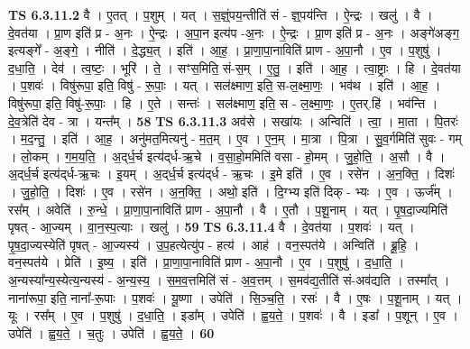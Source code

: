 \documentclass[17pt]{extarticle}
\begin{document}
                  \newline
                                \textbf{ TS 6.3.11.2} \newline
                  वै । ए॒तत् । प॒शुम् । यत् । स॒ज्ञ्ं॒पय॒न्तीति॑ सं - ज्ञ्॒पय॑न्ति । ऐ॒न्द्रः । खलु॑ । वै । दे॒वत॑या । प्रा॒ण इति॑ प्र - अ॒नः । ऐ॒न्द्रः । अ॒पा॒न इत्य॑प -अ॒नः । ऐ॒न्द्रः । प्रा॒ण इति॑ प्र - अ॒नः । अङ्गे॑अङ्ग॒ इत्यङ्गे᳚ - अ॒ङ्गे॒ । नीति॑ । दे॒द्ध्य॒त् । इति॑ । आ॒ह॒ । प्रा॒णा॒पा॒नाविति॑ प्राण - अ॒पा॒नौ । ए॒व । प॒शुषु॑ । द॒धा॒ति॒ । देव॑ । त्व॒ष्टः॒ । भूरि॑ । ते॒ । सꣳस॒मिति॒ सं-स॒म् । ए॒तु॒ । इति॑ । आ॒ह॒ । त्वा॒ष्ट्राः । हि । दे॒वत॑या । प॒शवः॑ । विषु॑रूपा॒ इति॒ विषु॑ - रू॒पाः॒ । यत् । सल॑क्ष्माण॒ इति॒ स-ल॒क्ष्मा॒णः॒ । भव॑थ । इति॑ । आ॒ह॒ । विषु॑रूपा॒ इति॒ विषु॑-रू॒पाः॒ । हि । ए॒ते । सन्तः॑ । सल॑क्ष्माण॒ इति॒ स - ल॒क्ष्मा॒णः॒ । ए॒तर्.हि॑ । भव॑न्ति । दे॒व॒त्रेति॑ देव - त्रा । यन्त᳚म् । \textbf{  58} \newline
                  \newline
                                \textbf{ TS 6.3.11.3} \newline
                  अव॑से । सखा॑यः । अन्विति॑ । त्वा॒ । मा॒ता । पि॒तरः॑ । म॒द॒न्तु॒ । इति॑ । आ॒ह॒ । अनु॑मत॒मित्यनु॑ - म॒त॒म् । ए॒व । ए॒न॒म् । मा॒त्रा । पि॒त्रा । सु॒व॒र्गमिति॑ सुवः - गम् । लो॒कम् । ग॒म॒य॒ति॒ । अ॒द्‌र्ध॒र्च इत्य॑द्‌र्ध-ऋ॒चे । व॒सा॒हो॒ममिति॑ वसा - हो॒मम् । जु॒हो॒ति॒ । अ॒सौ । वै । अ॒द्‌र्ध॒र्च इत्य॑द्‌र्ध-ऋ॒चः । इ॒यम् । अ॒द्‌र्ध॒र्च इत्य॑द्‌र्ध - ऋ॒चः । इ॒मे इति॑ । ए॒व । रसे॑न । अ॒न॒क्ति॒ । दिशः॑ । जु॒हो॒ति॒ । दिशः॑ । ए॒व । रसे॑न । अ॒न॒क्ति॒ । अथो॒ इति॑ । दि॒ग्भ्य इति॑ दिक् - भ्यः । ए॒व । ऊर्ज᳚म् । रस᳚म् । अवेति॑ । रु॒न्धे॒ । प्रा॒णा॒पा॒नाविति॑ प्राण - अ॒पा॒नौ । वै । ए॒तौ । प॒शू॒नाम् । यत् । पृ॒ष॒दा॒ज्यमिति॑ पृषत् - आ॒ज्यम् । वा॒न॒स्प॒त्याः । खलु॑ । \textbf{  59} \newline
                  \newline
                                \textbf{ TS 6.3.11.4} \newline
                  वै । दे॒वत॑या । प॒शवः॑ । यत् । पृ॒ष॒दा॒ज्यस्येति॑ पृषत् - आ॒ज्यस्य॑ । उ॒प॒हत्येत्यु॑प - हत्य॑ । आह॑ । वन॒स्पत॑ये । अन्विति॑ । ब्रू॒हि॒ । वन॒स्पत॑ये । प्रेति॑ । इ॒ष्य॒ । इति॑ । प्रा॒णा॒पा॒नाविति॑ प्राण - अ॒पा॒नौ । ए॒व । प॒शुषु॑ । द॒धा॒ति॒ । अ॒न्यस्या᳚न्य॒स्येत्य॒न्यस्य॑ - अ॒न्य॒स्य॒ । स॒म॒व॒त्तमिति॑ सं - अ॒व॒त्तम् । स॒मव॑द्य॒तीति॑ सं-अव॑द्यति । तस्मा᳚त् । नाना॑रूपा॒ इति॒ नाना᳚-रू॒पाः । प॒शवः॑ । यू॒ष्णा । उपेति॑ । सि॒ञ्च॒ति॒ । रसः॑ । वै । ए॒षः । प॒शू॒नाम् । यत् । यूः । रस᳚म् । ए॒व । प॒शुषु॑ । द॒धा॒ति॒ । इडा᳚म् । उपेति॑ । ह्व॒य॒ते॒ । प॒शवः॑ । वै । इडा᳚ । प॒शून् । ए॒व । उपेति॑ । ह्व॒य॒ते॒ । च॒तुः । उपेति॑ । ह्व॒य॒ते॒ । \textbf{  60} \newline
\end{document}
